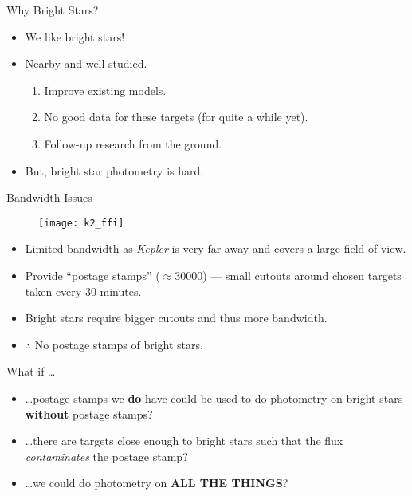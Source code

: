 \documentclass[10pt]{beamer}
\begin{document}
	\begin{frame}{Why Bright Stars?}
		\begin{itemize}
			\item We like bright stars!
			\item Nearby and well studied.
			\begin{enumerate}
				\item Improve existing models.
				\item No good data for these targets (for quite a while yet).
				\item Follow-up research from the ground.
			\end{enumerate}
			\item But, bright star photometry is hard.
		\end{itemize}
	\end{frame}

	\begin{frame}{Bandwidth Issues}
		\begin{overlayarea}{\textwidth}{.5\textheight}
			\begin{figure}
				\centering
					\texttt{[image: k2\_ffi]}
			\end{figure}
		\end{overlayarea}

		\vfill

		\begin{itemize}
			\item Limited bandwidth as \textit{Kepler} is very far away and covers a large field of view.
			\item Provide ``postage stamps'' ($\approx30000$) --- small cutouts around chosen targets taken every 30 minutes.
			\item Bright stars require bigger cutouts and thus more bandwidth.
			\item {\Large $\therefore$} No postage stamps of bright stars.
		\end{itemize}
	\end{frame}

	\begin{frame}{What if \dots}
		\begin{itemize}
			\item<2-> \dots postage stamps we \textbf{do} have could be used to do photometry on bright stars \textbf{without} postage stamps?
			\item<3-> \dots there are targets close enough to bright stars such that the flux \textit{contaminates} the postage stamp?
			\item<4-> \dots we could do photometry on \textbf{ALL THE THINGS}?
		\end{itemize}
	\end{frame}
\end{document}

